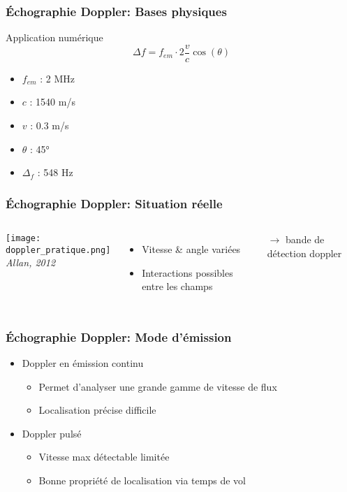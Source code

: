 \documentclass{beamer}
\begin{document}
\begin{frame}
\frametitle{\'Echographie Doppler:  Bases physiques}
Application numérique
\\
\vspace{0.5cm} 
\[ \Delta f = f_{em} \cdot 2 \frac{v}{c} \cos(\theta) \]
\vspace{0.5cm}
\begin{itemize}
\item $f_{em}$ : 2 MHz
\item $c$ : 1540 m/s
\vspace{0.2cm}
\item $v$ : 0.3 m/s 
\vspace{0.2cm}
\item $\theta$ : 45°
\vspace{0.2cm}
\item $\Delta_f$ : 548 Hz
\end{itemize}
\end{frame}

\begin{frame}
\frametitle{\'Echographie Doppler: Situation réelle  }
\begin{columns}
\column{60mm}
\texttt{[image: doppler\_pratique.png]}\\
\textit{Allan, 2012}
\column{60mm}
\begin{itemize}
\item Vitesse \& angle variées 
\vspace{0.4cm}
\item Interactions possibles entre les champs 
\end{itemize}
$\rightarrow$ bande de détection doppler
\end{columns}
\end{frame}

\begin{frame}
\frametitle{\'Echographie Doppler: Mode d'émission }
\begin{itemize}
\item Doppler en émission continu
\vspace{0.2cm}
\begin{itemize}
\item Permet d'analyser une grande gamme de vitesse de flux 
\vspace{0.2cm}
\item Localisation précise difficile
\vspace{0.2cm}
\end{itemize}
\item Doppler pulsé
\vspace{0.2cm}
\begin{itemize}
\item Vitesse max détectable limitée\\
\vspace{0.2cm}
\item Bonne propriété de localisation via temps de vol
\end{itemize}
\end{itemize}
\end{frame}
\end{document}
